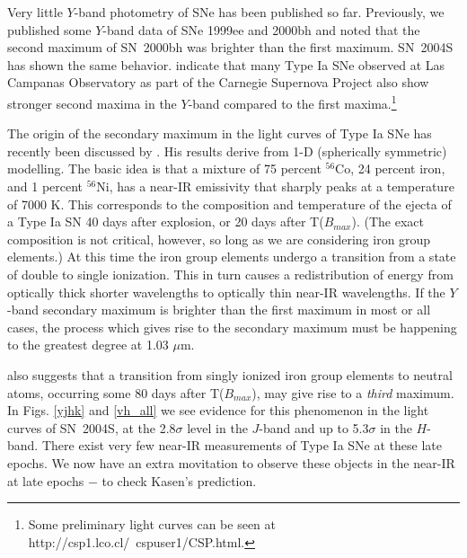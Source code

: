 \documentclass[12pt,preprint,psfig,epsf]{aastex}
\begin{document}

Very little $Y$-band photometry of SNe has been published so far.  
Previously, we published some $Y$-band data of SNe 1999ee and 2000bh
\citep{Kri_etal04b} and noted that the second maximum of SN~2000bh was
brighter than the first maximum. SN~2004S has shown the same behavior.  
\citet{Ham_etal06} indicate that many Type Ia SNe observed
at Las Campanas Observatory as part of the Carnegie Supernova Project also
show stronger second maxima in the $Y$-band compared to the first 
maxima.\footnote[16]{Some preliminary light curves can be seen at
http://csp1.lco.cl/~cspuser1/CSP.html.}

The origin of the secondary maximum in the light curves of Type Ia SNe
has recently been discussed by \citet{Kas06}.  His results derive from
1-D (spherically symmetric) modelling.  The basic idea is that 
a mixture of 75 percent $^{56}$Co, 24 percent iron, and 1 percent $^{56}$Ni,
has a near-IR emissivity that sharply peaks at a temperature of 7000 K.  This 
corresponds to the composition and temperature of the ejecta of
a Type Ia SN 40 days after explosion, or 20 days after T($B_{max}$).
(The exact composition is not critical, however, so long as we are considering
iron group elements.)
At this time the iron group elements undergo a transition from a state
of double to single ionization.  This in turn causes a redistribution 
of energy from optically thick shorter wavelengths to
optically thin near-IR wavelengths.  If the $Y$-band secondary
maximum is brighter than the first maximum in most or all cases, the process which
gives rise to the secondary maximum must be happening to the greatest degree
at 1.03 $\mu$m.  

\citet{Kas06} also suggests that a transition from singly ionized iron group elements
to neutral atoms, occurring some 80 days after T($B_{max}$), may give rise to a {\em
third} maximum.  In Figs. \ref{yjhk} and \ref{vh_all} we see evidence for this
phenomenon in the light curves of SN~2004S, at the 2.8$\sigma$ level in the $J$-band
and up to 5.3$\sigma$ in the $H$-band. There exist very few near-IR measurements of
Type Ia SNe at these late epochs. We now have an extra movitation to observe these
objects in the near-IR at late epochs $-$ to check Kasen's prediction.
\end{document}
